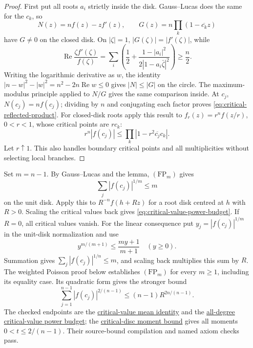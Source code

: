 \begin{proof}
First put all roots $a_i$ strictly inside the disk.  Gauss--Lucas does the
same for the $c_k$, so
\[
 N(z)=nf(z)-zf'(z),\qquad
 G(z)=n\prod_k(1-\overline{c_k}z)
\]
have $G\ne0$ on the closed disk.  On $|\zeta|=1$,
$|G(\zeta)|=|f'(\zeta)|$, while
\[
 \operatorname{Re}\frac{\zeta f'(\zeta)}{f(\zeta)}
 =\sum_i\left(\frac12+
       \frac{1-|a_i|^2}{2|1-a_i\bar\zeta|^2}\right)\ge\frac n2.
\]
Writing the logarithmic derivative as $w$, the identity
$|n-w|^2-|w|^2=n^2-2n\operatorname{Re}w\le0$ gives
$|N|\le|G|$ on the circle.  The maximum-modulus principle applied to
$N/G$ gives the same comparison inside.  At $c_j$, $N(c_j)=nf(c_j)$;
dividing by $n$ and conjugating each factor proves
\eqref{eq:critical-reflected-product}.
For closed-disk roots apply this result to
$f_r(z)=r^nf(z/r)$, $0<r<1$, whose critical points are $rc_k$:
\[
 r^n|f(c_j)|\le\prod_k|1-r^2\overline{c_j}c_k|.
\]
Let $r\uparrow1$.  This also handles boundary critical points and all
multiplicities without selecting local branches.
\end{proof}

Set $m=n-1$. By Gauss--Lucas and the lemma, $(\mathrm{FP}_m)$ gives
\[
 \sum_j |f(c_j)|^{1/m}\le m
\]
on the unit disk. Apply this to $R^{-n}f(h+Rz)$ for a root disk
centred at $h$ with $R>0$. Scaling the critical values back gives
\eqref{eq:critical-value-power-budget}. If $R=0$, all critical values
vanish. For the linear consequence put $y_j=|f(c_j)|^{1/m}$ in the
unit-disk normalization and use
\[
 y^{m/(m+1)}\le\frac{my+1}{m+1}\quad(y\ge0).
\]
Summation gives $\sum_j|f(c_j)|^{1/n}\le m$, and scaling back multiplies
this sum by $R$. The weighted Poisson proof below establishes $(\mathrm{FP}_m)$
for every $m\ge1$, including its equality case. Its quadratic form gives the
stronger bound
\[
 \sum_{j=1}^{n-1}|f(c_j)|^{2/(n-1)}\le(n-1)R^{2n/(n-1)}.
\]
The checked endpoints are the
\href{https://github.com/wcook04/plectis-erdos/blob/3f1a5e9b284b9c3348eebd549e24c2f3972606ae/ErdosProblems/Erdos1041/PaperCriticalValueMeanR10.lean#L101}{critical-value mean identity}
and the
\href{https://github.com/wcook04/plectis-erdos/blob/3f1a5e9b284b9c3348eebd549e24c2f3972606ae/ErdosProblems/Erdos1041/PaperCriticalValueMeanR10.lean#L121}{all-degree critical-value power budget};
the
\href{https://github.com/wcook04/plectis-erdos/blob/3f1a5e9b284b9c3348eebd549e24c2f3972606ae/ErdosProblems/Erdos1041/PaperCriticalValueMeanR10.lean#L85}{critical-disc moment bound}
gives all moments $0<t\le2/(n-1)$. Their source-bound compilation and named
axiom checks pass.

